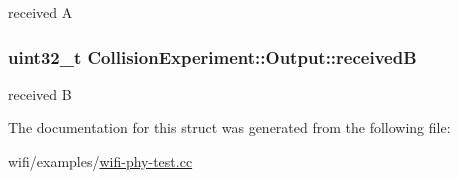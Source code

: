 received A 

\subsubsection[{\texorpdfstring{receivedB}{receivedB}}]{\setlength{\rightskip}{0pt plus 5cm}uint32\+\_\+t Collision\+Experiment\+::\+Output\+::receivedB}\hypertarget{structCollisionExperiment_1_1Output_aecf9ff6b62ec5f8511a82052ed182353}{}\label{structCollisionExperiment_1_1Output_aecf9ff6b62ec5f8511a82052ed182353}


received B 



The documentation for this struct was generated from the following file\+:\begin{DoxyCompactItemize}
\item 
wifi/examples/\hyperlink{wifi-phy-test_8cc}{wifi-\/phy-\/test.\+cc}\end{DoxyCompactItemize}
